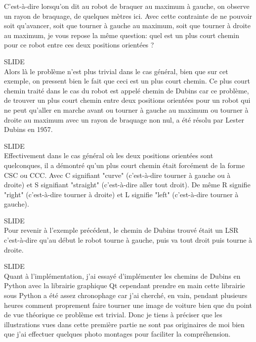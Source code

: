 \documentclass[12pt,a4paper]{article}
\newcommand{\slide}{\vspace{0.6cm}SLIDE\\}
\begin{document}
	C'est-à-dire lorsqu'on dit au robot de braquer au maximum à gauche, on observe un rayon de braquage, de quelques mètres ici. Avec cette contrainte de ne pouvoir soit qu'avancer, soit que tourner à gauche au maximum, soit que tourner à droite au maximum, je vous repose la même question: quel est un plus court chemin pour ce robot entre ces deux positions orientées ?
	
	\slide
	
	Alors là le problème n'est plus trivial dans le cas général, bien que sur cet exemple, on pressent bien le fait que ceci est un plus court chemin. Ce plus court chemin traité dans le cas du robot est appelé chemin de Dubins car ce problème, de trouver un plus court chemin entre deux positions orientées pour un robot qui ne peut qu'aller en marche avant ou tourner à gauche au maximum ou tourner à droite au maximum avec un rayon de braquage non nul, a été résolu par Lester Dubins en 1957.
	
	\slide
	
	Effectivement dans le cas général où les deux positions orientées sont quelconques, il a démontré qu'un plus court chemin était forcément de la forme CSC ou CCC. Avec C signifiant "curve" (c'est-à-dire tourner à gauche ou à droite) et S signifiant "straight" (c'est-à-dire aller tout droit). De même R signifie "right" (c'est-à-dire tourner à droite) et L signifie "left" (c'est-à-dire tourner à gauche).
	
	\slide
	
	Pour revenir à l'exemple précédent, le chemin de Dubins trouvé était un LSR c'est-à-dire qu'au début le robot tourne à gauche, puis va tout droit puis tourne à droite. %
	
	\slide
	
	Quant à l'implémentation, j'ai essayé d'implémenter les chemins de Dubins en Python avec la librairie graphique Qt cependant prendre en main cette librairie sous Python a été assez chronophage car j'ai cherché, en vain, pendant plusieurs heures comment proprement faire tourner une image de voiture bien que du point de vue théorique ce problème est trivial. Donc je tiens à préciser que les illustrations vues dans cette première partie ne sont pas originaires de moi bien que j'ai effectuer quelques photo montages pour faciliter la compréhension.%
	
\end{document}
